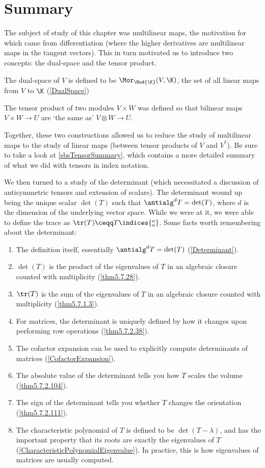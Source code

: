 \section{Summary}

The subject of study of this chapter was multilinear maps, the motivation for which came from differentiation (where the higher derivatives are multilinear maps in the tangent vectors).  This in turn motivated us to introduce two concepts:  the dual-space and the tensor product.

The dual-space of $V$ is defined to be $\Mor _{\Mod{\K}}(V,\K )$, the set of all linear maps from $V$ to $\K$ (\cref{DualSpace})

The tensor product of two modules $V\times W$ was defined so that bilinear maps $V\times W\rightarrow U$ are `the same as' $V\otimes W\rightarrow U$.

Together, these two constructions allowed us to reduce the study of multilinear maps to the study of linear maps (between tensor products of $V$ and $V^*$).  Be sure to take a look at \cref{sbsTensorSummary}, which contains a more detailed summary of what we did with tensors in index notation.

We then turned to a study of the determinant (which necessitated a discussion of antisymmetric tensors and extension of scalars).  The determinant wound up being the unique scalar $\det (T)$ such that $\antialg ^dT=\det (T)$, where $d$ is the dimension of the underlying vector space.  While we were at it, we were able to define the trace as $\tr (T)\ceqq T\indices{^a_a}$.  Some facts worth remembering about the determinant:
\begin{enumerate}
	\item The definition itself, essentially $\antialg ^dT=\det (T)$ (\cref{Determinant}).
	\item $\det (T)$ is the product of the eigenvalues of $T$ in an algebraic closure counted with multiplicity (\cref{thm5.7.28}).
	\item $\tr (T)$ is the sum of the eigenvalues of $T$ in an algebraic closure counted with multiplicity (\cref{thm5.7.1.3}).
	\item For matrices, the determinant is uniquely defined by how it changes upon performing row operations (\cref{thm5.7.2.38}).
	\item The cofactor expansion can be used to explicitly compute determinants of matrices (\cref{CofactorExpansion}).
	\item The absolute value of the determinant tells you how $T$ scales the volume (\cref{thm5.7.2.104}).
	\item The sign of the determinant tells you whether $T$ changes the orientation (\cref{thm5.7.2.111}).
	\item The characteristic polynomial of $T$ is defined to be $\det (T-\lambda )$, and has the important property that its roots are exactly the eigenvalues of $T$ (\cref{CharacteristicPolynomialEigenvalue}).  In practice, this is how eigenvalues of matrices are usually computed.
\end{enumerate}

